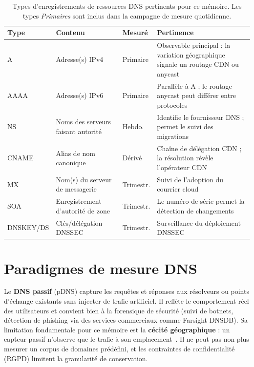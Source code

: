 \begin{table}[tp]
\centering
\small
\begin{tabularx}{\linewidth}{p{1.4cm} p{3.6cm} l X}
\toprule
\textbf{Type} & \textbf{Contenu} & \textbf{Mesuré} & \textbf{Pertinence} \\
\midrule
A     & Adresse(s) IPv4                   & Primaire  & Observable principal : la variation géographique signale un routage CDN ou anycast \\
AAAA  & Adresse(s) IPv6                   & Primaire  & Parallèle à A ; le routage anycast peut différer entre protocoles~\cite{Bortzmeyer2013} \\
NS    & Noms des serveurs faisant autorité & Hebdo.   & Identifie le fournisseur DNS ; permet le suivi des migrations~\cite{Xu2023} \\
CNAME & Alias de nom canonique            & Dérivé    & Chaîne de délégation CDN ; la résolution révèle l'opérateur CDN \\
MX    & Nom(s) du serveur de messagerie   & Trimestr. & Suivi de l'adoption du courrier cloud~\cite{vanRijswijk2016} \\
SOA   & Enregistrement d'autorité de zone & Trimestr. & Le numéro de série permet la détection de changements \\
DNSKEY/DS & Clés/délégation DNSSEC      & Trimestr. & Surveillance du déploiement DNSSEC~\cite{vanRijswijk2016} \\
\bottomrule
\end{tabularx}
\caption{Types d'enregistrements de ressources DNS pertinents pour ce mémoire. Les types \textit{Primaires} sont inclus dans la campagne de mesure quotidienne.}
\label{tab:rr_types}
\end{table}

\section{Paradigmes de mesure DNS}
\label{sec:2.2}

Le \textbf{DNS passif} (pDNS) capture les requêtes et réponses aux résolveurs ou points d'échange existants sans injecter de trafic artificiel. Il reflète le comportement réel des utilisateurs et convient bien à la forensique de sécurité (suivi de botnets, détection de phishing via des services commerciaux comme Farsight DNSDB). Sa limitation fondamentale pour ce mémoire est la \textbf{cécité géographique} : un capteur passif n'observe que le trafic à son emplacement~\cite{vanRijswijk2016}. Il ne peut pas non plus mesurer un corpus de domaines prédéfini, et les contraintes de confidentialité (RGPD) limitent la granularité de conservation.

